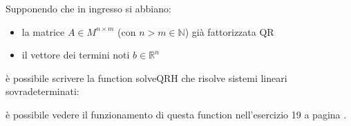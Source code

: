 \begin{flushleft}
Supponendo che in ingresso si abbiano:
\begin{itemize}
    \item la matrice $A\in M^{n\times m}$ (con $n>m\in \mathbb{N}$) già fattorizzata QR 
    \item il vettore dei termini noti $b \in \mathbb{R}^{n}$ 
\end{itemize}
è possibile scrivere la function solveQRH che risolve sistemi lineari sovradeterminati:

è possibile vedere il funzionamento di questa function nell'esercizio 19 a pagina \pageref{es319}.
\end{flushleft}